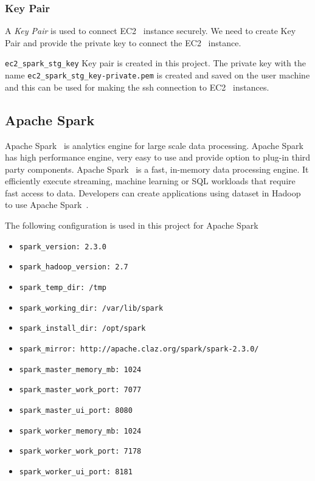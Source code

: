 \subsubsection{Key Pair}

A \emph{Key Pair} is used to connect EC2~\cite{hid-sp18-511-www-ec2}
instance securely. We need to create Key Pair and provide the private
key to connect the EC2~\cite{hid-sp18-511-www-ec2} instance.

\verb|ec2_spark_stg_key| Key pair is created in this project.
The private key with the name \verb|ec2_spark_stg_key-private.pem| is
created and saved on the user machine and this can be used for making
the ssh connection to EC2~\cite{hid-sp18-511-www-ec2} instances.

\subsection{Apache Spark}\label{S:spark}

Apache Spark~\cite{hid-sp18-511-www-spark} is analytics engine for
large scale data processing. Apache
Spark~\cite{hid-sp18-511-www-spark} has high performance engine, very
easy to use and provide option to plug-in third party components.
Apache Spark~\cite{hid-sp18-511-www-spark} is a fast, in-memory data
processing engine. It efficiently execute streaming, machine learning
or SQL workloads that require fast access to data. Developers can
create applications using dataset in
Hadoop~\cite{hid-sp18-511-www-hadoop} to use Apache
Spark~\cite{hid-sp18-511-www-spark}.

The following configuration is used in this project for Apache Spark

\begin{itemize}
	\item \verb|spark_version: 2.3.0|
	\item \verb|spark_hadoop_version: 2.7|
	\item \verb|spark_temp_dir: /tmp|
	\item \verb|spark_working_dir: /var/lib/spark|
	\item \verb|spark_install_dir: /opt/spark|
	\item \verb|spark_mirror: http://apache.claz.org/spark/spark-2.3.0/|
	\item \verb|spark_master_memory_mb: 1024|
	\item \verb|spark_master_work_port: 7077|
	\item \verb|spark_master_ui_port: 8080|
	\item \verb|spark_worker_memory_mb: 1024|
	\item \verb|spark_worker_work_port: 7178|
	\item \verb|spark_worker_ui_port: 8181|
\end{itemize}

